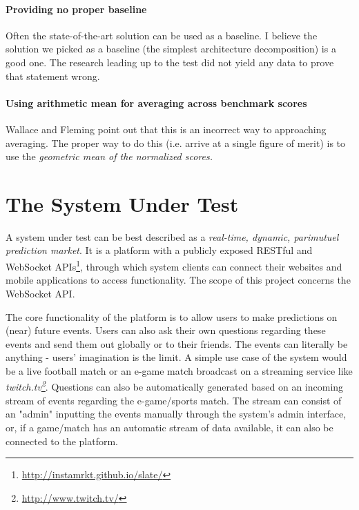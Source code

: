 \documentclass{uvamscse}
\begin{document}
\subsubsection{Providing no proper baseline}
Often the state-of-the-art solution can be used as a baseline. I believe the solution we picked as a baseline (the simplest architecture decomposition) is a good one. The research leading up to the test did not yield any data to prove that statement wrong.

\subsubsection{Using arithmetic mean for averaging across benchmark scores}
Wallace and Fleming \cite{Fleming} point out that this is an incorrect way to approaching averaging.
The proper way to do this (i.e. arrive at a single figure of merit) is to use the \textit{geometric mean of the normalized scores.}


\chapter{The System Under Test}\label{The System Under Test}

A system under test can be best described as a \textit{real-time, dynamic, parimutuel prediction market}. It is a platform with a publicly exposed RESTful and WebSocket APIs\footnote{\url{http://instamrkt.github.io/slate/}}, through which system clients can connect their websites and mobile applications to access functionality. The scope of this project concerns the WebSocket API.

The core functionality of the platform is to allow users to make predictions on (near) future events. Users can also ask their own questions regarding these events and send them out globally or to their friends. The events can literally be anything - users' imagination is the limit. A simple use case of the system would be a live football match or an e-game match broadcast on a streaming service like \textit{twitch.tv\footnote{\url{http://www.twitch.tv/}}}. Questions can also be automatically generated based on an incoming stream of events regarding the e-game/sports match. The stream can consist of an "admin" inputting the events manually through the system's admin interface, or, if a game/match has an automatic stream of data available, it can also be connected to the platform.
\end{document}
